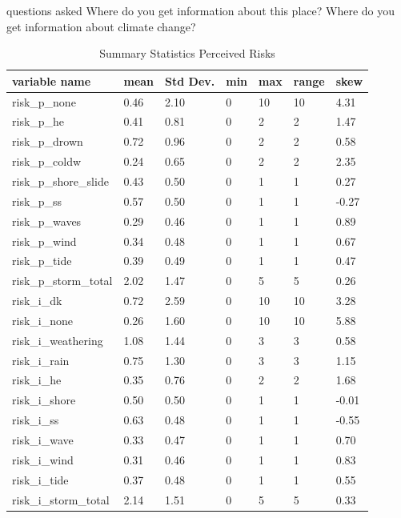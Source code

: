 questions asked Where do you get information about this place? Where do you get information about climate change?
\begin{center}
\begin{table}[h]
    \centering
    \begin{tabular}{|l|l|l|l|l|l|l|}
    \hline
        variable name & mean & Std Dev. & min & max & range & skew \\ \hline
        risk\_p\_none & 0.46 & 2.10 & 0 & 10 & 10 & 4.31\\ \hline
        risk\_p\_he & 0.41 & 0.81 & 0 & 2 & 2 & 1.47 \\ \hline
        risk\_p\_drown & 0.72 & 0.96 & 0 & 2 & 2 & 0.58  \\ \hline
        risk\_p\_coldw & 0.24 & 0.65 & 0 & 2 & 2 & 2.35  \\ \hline
        risk\_p\_shore\_slide & 0.43 & 0.50 & 0 & 1 & 1 & 0.27 \\ \hline
        risk\_p\_ss & 0.57 & 0.50 & 0 & 1 & 1 & -0.27  \\ \hline
        risk\_p\_waves & 0.29 & 0.46 & 0 & 1 & 1 & 0.89 \\ \hline
        risk\_p\_wind & 0.34 & 0.48 & 0 & 1 & 1 & 0.67  \\ \hline
        risk\_p\_tide & 0.39 & 0.49 & 0 & 1 & 1 & 0.47  \\ \hline
        risk\_p\_storm\_total & 2.02 & 1.47 & 0 & 5 & 5 & 0.26  \\ \hline
        risk\_i\_dk & 0.72 & 2.59 & 0 & 10 & 10 & 3.28  \\ \hline
        risk\_i\_none & 0.26 & 1.60 & 0 & 10 & 10 & 5.88 \\ \hline
        risk\_i\_weathering & 1.08 & 1.44 & 0 & 3 & 3 & 0.58  \\ \hline
        risk\_i\_rain & 0.75 & 1.30 & 0 & 3 & 3 & 1.15\\ \hline
        risk\_i\_he & 0.35 & 0.76 & 0 & 2 & 2 & 1.68 \\ \hline
        risk\_i\_shore & 0.50 & 0.50 & 0 & 1 & 1 & -0.01 \\ \hline
        risk\_i\_ss & 0.63 & 0.48 & 0 & 1 & 1 & -0.55  \\ \hline
        risk\_i\_wave & 0.33 & 0.47 & 0 & 1 & 1 & 0.70  \\ \hline
        risk\_i\_wind & 0.31 & 0.46 & 0 & 1 & 1 & 0.83 \\ \hline
        risk\_i\_tide & 0.37 & 0.48 & 0 & 1 & 1 & 0.55  \\ \hline
        risk\_i\_storm\_total & 2.14 & 1.51 & 0 & 5 & 5 & 0.33 \\ \hline
          \end{tabular}
    \caption{Summary Statistics Perceived Risks}
\label{table:summary_stats_percieved_risks}
\end{table}
\end{center}


